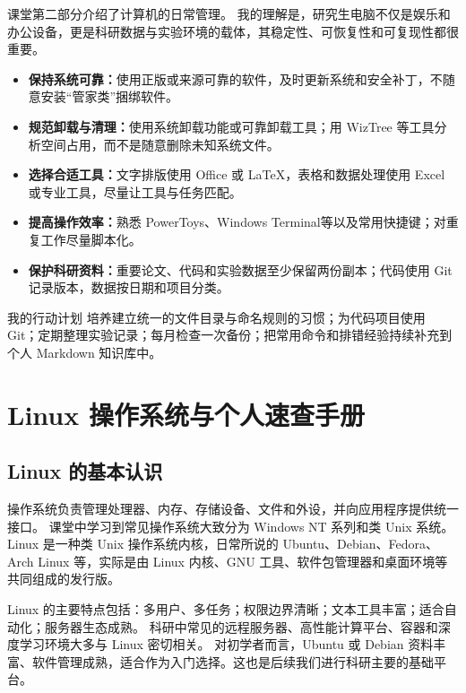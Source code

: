 \documentclass[UTF8,zihao=-4,a4paper,fontset=windows]{ctexart}
\begin{document}
课堂第二部分介绍了计算机的日常管理。
我的理解是，研究生电脑不仅是娱乐和办公设备，更是科研数据与实验环境的载体，其稳定性、可恢复性和可复现性都很重要。

\begin{itemize}
  \item \textbf{保持系统可靠：}使用正版或来源可靠的软件，及时更新系统和安全补丁，不随意安装“管家类”捆绑软件。
  \item \textbf{规范卸载与清理：}使用系统卸载功能或可靠卸载工具；用 WizTree 等工具分析空间占用，而不是随意删除未知系统文件。
  \item \textbf{选择合适工具：}文字排版使用 Office 或 \LaTeX，表格和数据处理使用 Excel 或专业工具，尽量让工具与任务匹配。
  \item \textbf{提高操作效率：}熟悉 PowerToys、Windows Terminal等以及常用快捷键；对重复工作尽量脚本化。
  \item \textbf{保护科研资料：}重要论文、代码和实验数据至少保留两份副本；代码使用 Git 记录版本，数据按日期和项目分类。
\end{itemize}

\begin{tipbox}{我的行动计划}
培养建立统一的文件目录与命名规则的习惯；为代码项目使用 Git；定期整理实验记录；每月检查一次备份；把常用命令和排错经验持续补充到个人 Markdown 知识库中。
\end{tipbox}

\section{Linux 操作系统与个人速查手册}

\subsection{Linux 的基本认识}

操作系统负责管理处理器、内存、存储设备、文件和外设，并向应用程序提供统一接口。
课堂中学习到常见操作系统大致分为 Windows NT 系列和类 Unix 系统。
Linux 是一种类 Unix 操作系统内核，日常所说的 Ubuntu、Debian、Fedora、Arch Linux 等，实际是由 Linux 内核、GNU 工具、软件包管理器和桌面环境等共同组成的发行版。

Linux 的主要特点包括：多用户、多任务；权限边界清晰；文本工具丰富；适合自动化；服务器生态成熟。
科研中常见的远程服务器、高性能计算平台、容器和深度学习环境大多与 Linux 密切相关。
对初学者而言，Ubuntu 或 Debian 资料丰富、软件管理成熟，适合作为入门选择。这也是后续我们进行科研主要的基础平台。
\end{document}
